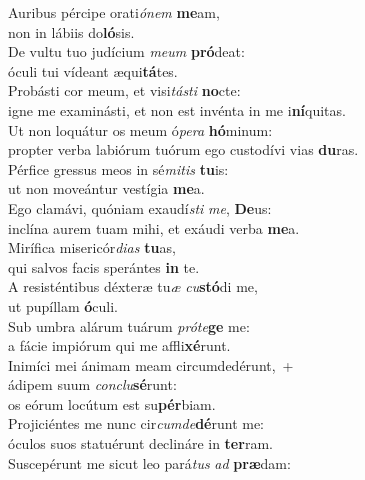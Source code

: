 \evenverse Auribus pércipe orati\textit{ó}\textit{nem} \textbf{me}am,~\*\\
\evenverse non in lábiis do\textbf{ló}sis.\\
\oddverse De vultu tuo judícium \textit{me}\textit{um} \textbf{pró}deat:~\*\\
\oddverse óculi tui vídeant æqui\textbf{tá}tes.\\
\evenverse Probásti cor meum, et visi\textit{tá}\textit{sti} \textbf{no}cte:~\*\\
\evenverse igne me examinásti, et non est invénta in me i\textbf{ní}quitas.\\
\oddverse Ut non loquátur os meum ó\textit{pe}\textit{ra} \textbf{hó}minum:~\*\\
\oddverse propter verba labiórum tuórum ego custodívi vias \textbf{du}ras.\\
\evenverse Pérfice gressus meos in sé\textit{mi}\textit{tis} \textbf{tu}is:~\*\\
\evenverse ut non moveántur vestígia \textbf{me}a.\\
\oddverse Ego clamávi, quóniam exaudí\textit{sti} \textit{me}, \textbf{De}us:~\*\\
\oddverse inclína aurem tuam mihi, et exáudi verba \textbf{me}a.\\
\evenverse Mirífica misericór\textit{di}\textit{as} \textbf{tu}as,~\*\\
\evenverse qui salvos facis sperántes \textbf{in} te.\\
\oddverse A resisténtibus déxteræ tu\textit{æ} \textit{cu}\textbf{stó}di me,~\*\\
\oddverse ut pupíllam \textbf{ó}culi.\\
\evenverse Sub umbra alárum tuárum \textit{pró}\textit{te}\textbf{ge} me:~\*\\
\evenverse a fácie impiórum qui me affli\textbf{xé}runt.\\
\oddverse Inimíci mei ánimam meam circumdedérunt,~+\\
\oddverse  ádipem suum \textit{con}\textit{clu}\textbf{sé}runt:~\*\\
\oddverse os eórum locútum est su\textbf{pér}biam.\\
\evenverse Projiciéntes me nunc cir\textit{cum}\textit{de}\textbf{dé}runt me:~\*\\
\evenverse óculos suos statuérunt declináre in \textbf{ter}ram.\\
\oddverse Suscepérunt me sicut leo pará\textit{tus} \textit{ad} \textbf{præ}dam:~\*\\
